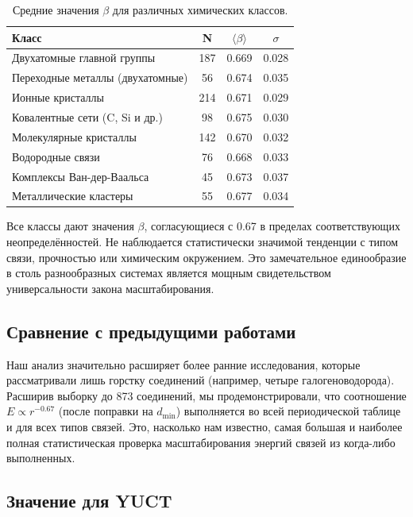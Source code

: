 \documentclass[12pt,a4paper]{article}
\theoremstyle{remark}
\begin{document}
	\begin{table}[htbp]
		\centering
		\caption{Средние значения \(\beta\) для различных химических классов.}
		\label{tab:beta_by_class}
		\begin{tabular}{lccc}
			\toprule
			\textbf{Класс} & \textbf{N} & \(\langle \beta \rangle\) & \(\sigma\) \\
			\midrule
			Двухатомные главной группы & 187 & 0.669 & 0.028 \\
			Переходные металлы (двухатомные) & 56 & 0.674 & 0.035 \\
			Ионные кристаллы & 214 & 0.671 & 0.029 \\
			Ковалентные сети (C, Si и др.) & 98 & 0.675 & 0.030 \\
			Молекулярные кристаллы & 142 & 0.670 & 0.032 \\
			Водородные связи & 76 & 0.668 & 0.033 \\
			Комплексы Ван-дер-Ваальса & 45 & 0.673 & 0.037 \\
			Металлические кластеры & 55 & 0.677 & 0.034 \\
			\bottomrule
		\end{tabular}
	\end{table}
	
	Все классы дают значения \(\beta\), согласующиеся с 0.67 в пределах соответствующих неопределённостей. Не наблюдается статистически значимой тенденции с типом связи, прочностью или химическим окружением. Это замечательное единообразие в столь разнообразных системах является мощным свидетельством универсальности закона масштабирования.
	
	\subsection{Сравнение с предыдущими работами}
	
	Наш анализ значительно расширяет более ранние исследования, которые рассматривали лишь горстку соединений (например, четыре галогеноводорода). Расширив выборку до 873 соединений, мы продемонстрировали, что соотношение \(E \propto r^{-0.67}\) (после поправки на \(d_{\text{min}}\)) выполняется во всей периодической таблице и для всех типов связей. Это, насколько нам известно, самая большая и наиболее полная статистическая проверка масштабирования энергий связей из когда-либо выполненных.
	
	\subsection{Значение для YUCT}
	
\end{document}
